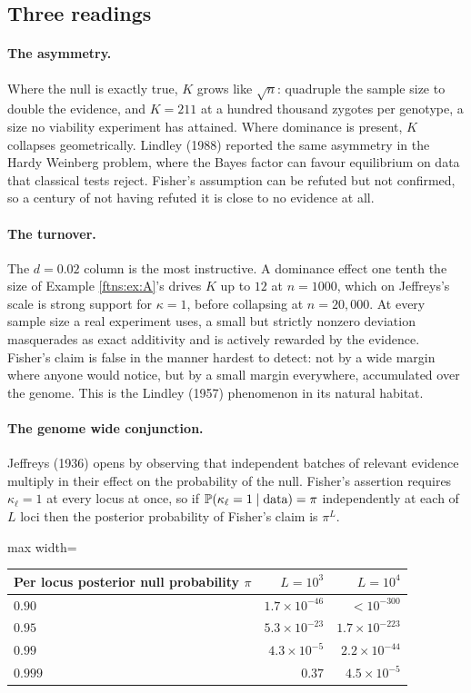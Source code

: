 \subsection{Three readings}

\paragraph{The asymmetry.} Where the null is exactly true, $K$ grows like $\sqrt n$: quadruple the
sample size to double the evidence, and $K=211$ at a hundred thousand zygotes per genotype, a size
no viability experiment has attained. Where dominance is present, $K$ collapses geometrically.
Lindley (1988) reported the same asymmetry in the Hardy Weinberg problem, where the Bayes factor
can favour equilibrium on data that classical tests reject. Fisher's assumption can be refuted but
not confirmed, so a century of not having refuted it is close to no evidence at all.

\paragraph{The turnover.} The $d=0.02$ column is the most instructive. A dominance effect one tenth
the size of Example \ref{ftns:ex:A}'s drives $K$ up to $12$ at $n=1000$, which on Jeffreys's scale is
strong support for $\kappa=1$, before collapsing at $n=20{,}000$. At every sample size a real
experiment uses, a small but strictly nonzero deviation masquerades as exact additivity and is
actively rewarded by the evidence. Fisher's claim is false in the manner hardest to detect: not by
a wide margin where anyone would notice, but by a small margin everywhere, accumulated over the
genome. This is the Lindley (1957) phenomenon in its natural habitat.

\paragraph{The genome wide conjunction.} Jeffreys (1936) opens by observing that independent
batches of relevant evidence multiply in their effect on the probability of the null. Fisher's
assertion requires $\kappa_\ell=1$ at every locus at once, so if
$\mathbb{P}(\kappa_\ell=1\mid\text{data})=\pi$ independently at each of $L$ loci then the posterior
probability of Fisher's claim is $\pi^L$.

\begin{center}
\begin{adjustbox}{max width=\textwidth}
\begin{tabular}{lrr}
\toprule
Per locus posterior null probability $\pi$ & $L=10^{3}$ & $L=10^{4}$ \\
\midrule
$0.90$  & $1.7\times10^{-46}$ & $<10^{-300}$ \\
$0.95$  & $5.3\times10^{-23}$ & $1.7\times10^{-223}$ \\
$0.99$  & $4.3\times10^{-5}$  & $2.2\times10^{-44}$ \\
$0.999$ & $0.37$              & $4.5\times10^{-5}$ \\
\bottomrule
\end{tabular}
\end{adjustbox}
\end{center}

